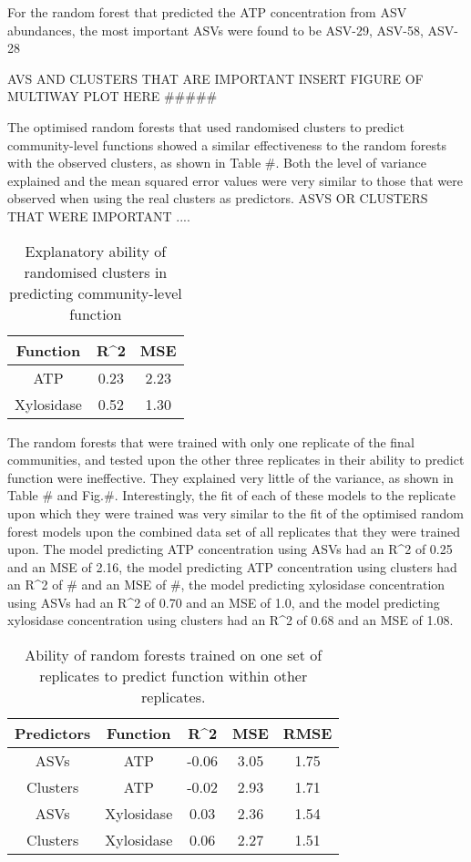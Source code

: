 \documentclass[11pt]{article}
\begin{document}
For the random forest that predicted the ATP concentration from ASV abundances, the most important ASVs were found to be ASV-29, ASV-58, ASV-28

AVS AND CLUSTERS THAT ARE IMPORTANT
INSERT FIGURE OF MULTIWAY PLOT HERE #####

The optimised random forests that used randomised clusters to predict community-level functions showed a similar effectiveness to the random forests with the observed clusters, as shown in Table #. Both the level of variance explained and the mean squared error values were very similar to those that were observed when using the real clusters as predictors.
ASVS OR CLUSTERS THAT WERE IMPORTANT ....
\begin{table}[h]
\centering
\caption{Explanatory ability of randomised clusters in predicting community-level function}
\label{tab:sample}
\begin{tabular}{|c|c|c|}
\hline
Function & R^2 & MSE \\
\hline
ATP & 0.23 & 2.23 \\
Xylosidase & 0.52 & 1.30 \\
\hline
\end{tabular}
\end{table}

The random forests that were trained with only one replicate of the final communities, and tested upon the other three replicates in their ability to predict function were ineffective. They explained very little of the variance, as shown in Table # and Fig.#. Interestingly, the fit of each of these models to the replicate upon which they were trained was very similar to the fit of the optimised random forest models upon the combined data set of all replicates that they were trained upon. The model predicting ATP concentration using ASVs had an R^2 of 0.25 and an MSE of 2.16, the model predicting ATP concentration using clusters had an R^2 of # and an MSE of #, the model predicting xylosidase concentration using ASVs had an R^2 of 0.70 and an MSE of 1.0, and the model predicting xylosidase concentration using clusters had an R^2 of 0.68 and an MSE of 1.08.
\begin{table}[h]
\centering
\caption{Ability of random forests trained on one set of replicates to predict function within other replicates.}
\label{tab:sample}
\begin{tabular}{|c|c|c|c|c|}
\hline
Predictors & Function & R^2 & MSE & RMSE \\
\hline
ASVs & ATP & -0.06 & 3.05 & 1.75 \\
Clusters & ATP & -0.02 & 2.93 & 1.71  \\
ASVs & Xylosidase & 0.03 & 2.36 & 1.54 \\
Clusters & Xylosidase & 0.06 & 2.27 & 1.51 \\
\hline
\end{tabular}
\end{table}
\end{document}
